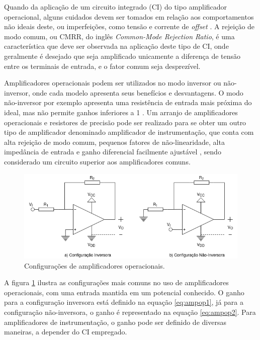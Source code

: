 Quando da aplicação de um circuito integrado (CI) do tipo amplificador
operacional, alguns cuidados devem ser tomados em relação aos
comportamentos não ideais deste, ou imperfeições, 
como tensão e corrente de \textit{offset} \cite{sedra1998microelectronic}.
A rejeição de modo comum, ou CMRR, do inglês \textit{Common-Mode Rejection Ratio},
é uma característica que deve ser observada na aplicação deste tipo de 
CI, onde geralmente é desejado que seja amplificado unicamente a 
diferença de tensão entre os terminais de entrada, e o fator comum
seja desprezível.

Amplificadores operacionais podem ser utilizados no modo inversor ou 
não-inversor, onde cada modelo apresenta seus benefícios e desvantagens.
O modo não-inversor por exemplo apresenta uma resistência de entrada mais
próxima do ideal, mas não permite ganhos inferiores a 1 \cite{sedra1998microelectronic}.
Um arranjo de amplificadores operacionais e resistores de precisão 
pode ser realizado para se obter um outro tipo de amplificador denominado
amplificador de instrumentação, que conta com alta rejeição de modo comum, 
pequenos fatores de não-linearidade, alta impedância de entrada e ganho
diferencial facilmente ajustável \cite{kitchin2006designer}, sendo 
considerado um circuito superior aos amplificadores comuns.

\begin{figure}[h]
    \caption{Configurações de amplificadores operacionais.}    
    
    \begin{centering}
        \includegraphics[width=1\columnwidth]{images/fundamentos/AmpOps.png}
    \par\end{centering}

    \label{fig:ampops}
\end{figure}

A figura \ref{fig:ampops} ilustra as configurações mais comuns no uso
de amplificadores operacionais, com uma entrada mantida em um potencial
conhecido. O ganho para a configuração inversora está definido na 
equação \ref{eq:ampop1}, já para a configuração não-inversora, o ganho é 
representado na equação \ref{eq:ampop2}. Para amplificadores de 
instrumentação, o ganho pode ser definido de diversas maneiras, a 
depender do CI empregado.

